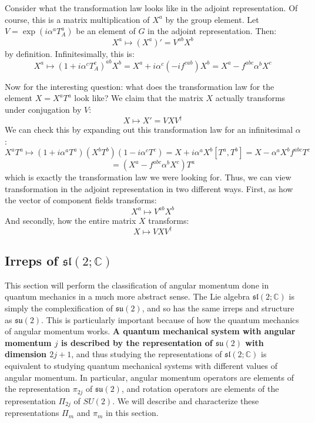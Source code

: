 \documentclass[11pt, oneside]{article}   	%
\theoremstyle{definition}
\begin{document}
Consider what the transformation law looks like in the adjoint representation. Of course, this is 
a matrix multiplication of $X^a$ by the group element. Let $V = \exp(i\alpha^a T_A^a)$ be an element of 
$G$ in the adjoint representation. Then:
\begin{equation}
	X^a\mapsto (X^a)' = V^{ab}X^b
\end{equation}
by definition. Infinitesimally, this is:
\begin{equation}
	X^a\mapsto (1 + i\alpha^c T_A^c)^{ab} X^b = X^a + i\alpha^c (-if^{cab})X^b = X^a - 
	f^{abc}\alpha^b X^c
\end{equation}

Now for the interesting question: what does the transformation law for the element $X = X^a T^a$ 
look like? We claim that the matrix $X$ actually transforms under conjugation by $V$:
\begin{equation}
	X\mapsto X' = VXV^\dagger
\end{equation}
We can check this by expanding out this transformation law for an infinitesimal $\alpha$:
$$
	X^a T^a\mapsto (1 + i\alpha^a T^a) (X^b T^b) (1 - i\alpha^c T^c) = X + i\alpha^a X^b [T^a, T^b]
	= X - \alpha^a X^bf^{abc}T^c 
$$
$$
	= (X^a - f^{abc}\alpha^b X^c)T^a
$$
which is exactly the transformation law we were looking for. Thus, we can view transformation in the 
adjoint representation in two different ways. First, as how the vector of component fields transforms:
\begin{equation}
	X^a\mapsto V^{ab} X^b
\end{equation}
And secondly, how the entire matrix $X$ transforms:
\begin{equation}
	X\mapsto VXV^\dagger
\end{equation}

\subsection{Irreps of $\mathfrak{sl}(2; \mathbb C)$}

This section will perform the classification of angular momentum done in quantum mechanics in a 
much more abstract sense. The Lie algebra $\mathfrak{sl}(2; \mathbb C)$ is simply the complexification 
of $\mathfrak{su}(2)$, and so has the same irreps and structure as $\mathfrak{su}(2)$. This is 
particularly important because of how the quantum mechanics of angular momentum works. \textbf{A 
quantum mechanical system with angular momentum $j$ is described by the representation of 
$\mathfrak{su}(2)$ with dimension $2j + 1$}, and thus studying the representations of $\mathfrak{sl}(2; \mathbb C)$ 
is equivalent to studying quantum mechanical systems with different values of angular momentum. 
In particular, angular momentum operators are elements of the representation $\pi_{2j}$ of $\mathfrak{su}(2)$, 
and rotation operators are elements of the representation $\Pi_{2j}$ of $SU(2)$. We will describe and characterize 
these representations $\Pi_m$ and $\pi_m$ in this section. 
\end{document}
